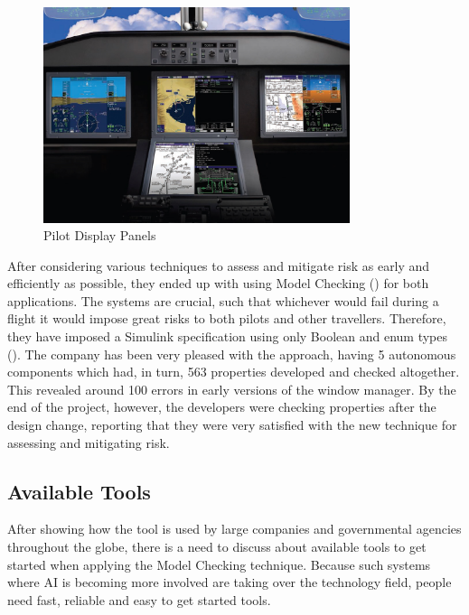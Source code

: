 \documentclass[paper=a4, fontsize=11pt]{scrartcl} %
\numberwithin{equation}{section} %
\numberwithin{figure}{section} %
\numberwithin{table}{section} %
\begin{document}
\begin{figure}[!ht]
    \centering
    \includegraphics[width=0.8\textwidth]{display-panels.jpg}
    \caption{Pilot Display Panels}
\end{figure}

After considering various techniques to assess and mitigate risk as early and efficiently as possible, they ended up with using Model Checking (\citet{rockwell-collins}) for both applications. The systems are crucial, such that whichever would fail during a flight it would impose great risks to both pilots and other travellers. Therefore, they have imposed a Simulink specification using only Boolean and enum types (\citet{acm-model-checking}). The company has been very pleased with the approach, having 5 autonomous components which had, in turn, 563 properties developed and checked altogether. This revealed around 100 errors in early versions of the window manager. By the end of the project, however, the developers were checking properties after the design change, reporting that they were very satisfied with the new technique for assessing and mitigating risk.



\subsection{Available Tools}

\par
After showing how the tool is used by large companies and governmental agencies throughout the globe, there is a need to discuss about available tools to get started when applying the Model Checking technique. Because such systems where AI is becoming more involved are taking over the technology field, people need fast, reliable and easy to get started tools.
\end{document}
